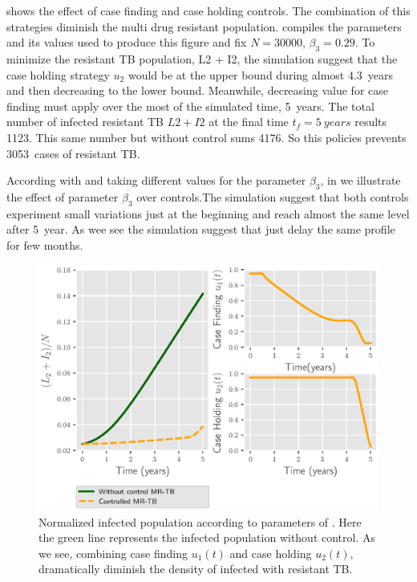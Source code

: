 %
	 shows the effect of case finding and 
case holding controls. The combination of this strategies diminish the multi 
drug resistant population.  compiles the 
parameters and its values used to produce this figure and fix 
$N = \num{30000}$, $\beta_3 = \num{0.29}$. To minimize the resistant TB 
population, L2 + I2, the simulation suggest that the case holding strategy 
$u_2$ would be at the upper bound during almost \SI{4.3}{years} and then 
decreasing to the lower bound. Meanwhile, decreasing value for case finding
must apply over the most of the simulated time, \SI{5}{years}. The total number 
of 
infected resistant TB $L2 + I2$  at the final time $t_f = \SI{5}{years}$ results
\num{1123}. This same number but without control sums 4176. So this policies 
prevents \SI{3053}{cases} of resistant TB.

  According with  and taking different values
for the parameter $\beta_3$, in  we illustrate 
the effect of parameter $\beta_3$ over controls.The 
simulation suggest that both controls experiment small variations just at the 
beginning and reach almost the same level after \SI{5}{year}. As wee see the 
simulation suggest that just delay the same profile for few months.
%
\begin{figure}[H]
  \centering
  \includegraphics{Figures/figure_1_two_strain_tbm}
  \caption{Normalized infected population according to parameters of 
  . Here the green line represents the 
  infected population without control. As we see, combining case finding 
  $u_1(t)$ and  case holding $u_2(t)$, dramatically diminish the density of 
  infected with resistant TB.}
  \label{fig:figure1twostraintbm}
\end{figure}

